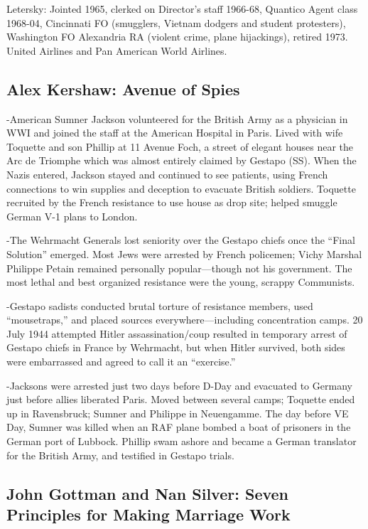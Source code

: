 \documentclass[
]{article}
\begin{document}
Letersky: Jointed 1965, clerked on Director's staff 1966-68, Quantico
Agent class 1968-04, Cincinnati FO (smugglers, Vietnam dodgers and
student protesters), Washington FO Alexandria RA (violent crime, plane
hijackings), retired 1973. United Airlines and Pan American World
Airlines.

\hypertarget{alex-kershaw-avenue-of-spies}{%
\subsection{Alex Kershaw: Avenue of
Spies}\label{alex-kershaw-avenue-of-spies}}

-American Sumner Jackson volunteered for the British Army as a physician
in WWI and joined the staff at the American Hospital in Paris. Lived
with wife Toquette and son Phillip at 11 Avenue Foch, a street of
elegant houses near the Arc de Triomphe which was almost entirely
claimed by Gestapo (SS). When the Nazis entered, Jackson stayed and
continued to see patients, using French connections to win supplies and
deception to evacuate British soldiers. Toquette recruited by the French
resistance to use house as drop site; helped smuggle German V-1 plans to
London.

-The Wehrmacht Generals lost seniority over the Gestapo chiefs once the
``Final Solution'' emerged. Most Jews were arrested by French policemen;
Vichy Marshal Philippe Petain remained personally popular---though not
his government. The most lethal and best organized resistance were the
young, scrappy Communists.

-Gestapo sadists conducted brutal torture of resistance members, used
``mousetraps,'' and placed sources everywhere---including concentration
camps. 20 July 1944 attempted Hitler assassination/coup resulted in
temporary arrest of Gestapo chiefs in France by Wehrmacht, but when
Hitler survived, both sides were embarrassed and agreed to call it an
``exercise.''

-Jacksons were arrested just two days before D-Day and evacuated to
Germany just before allies liberated Paris. Moved between several camps;
Toquette ended up in Ravensbruck; Sumner and Philippe in Neuengamme. The
day before VE Day, Sumner was killed when an RAF plane bombed a boat of
prisoners in the German port of Lubbock. Phillip swam ashore and became
a German translator for the British Army, and testified in Gestapo
trials.

\hypertarget{john-gottman-and-nan-silver-seven-principles-for-making-marriage-work}{%
\subsection{John Gottman and Nan Silver: Seven Principles for Making
Marriage
Work}\label{john-gottman-and-nan-silver-seven-principles-for-making-marriage-work}}
\end{document}

